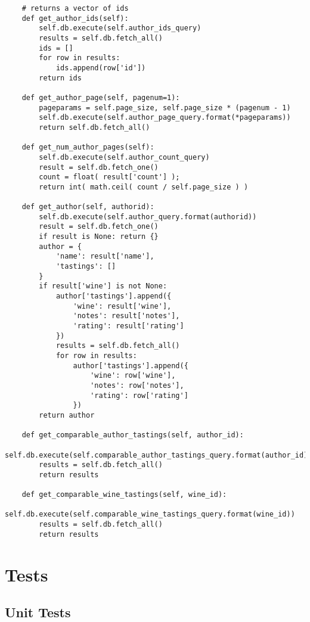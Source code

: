 \begin{verbatim}
    # returns a vector of ids
    def get_author_ids(self):
        self.db.execute(self.author_ids_query)
        results = self.db.fetch_all()
        ids = []
        for row in results:
            ids.append(row['id'])
        return ids

    def get_author_page(self, pagenum=1):
        pageparams = self.page_size, self.page_size * (pagenum - 1)
        self.db.execute(self.author_page_query.format(*pageparams))
        return self.db.fetch_all()

    def get_num_author_pages(self):
        self.db.execute(self.author_count_query)
        result = self.db.fetch_one()
        count = float( result['count'] );
        return int( math.ceil( count / self.page_size ) )

    def get_author(self, authorid):
        self.db.execute(self.author_query.format(authorid))
        result = self.db.fetch_one()
        if result is None: return {}
        author = {
            'name': result['name'],
            'tastings': []
        }
        if result['wine'] is not None:
            author['tastings'].append({
                'wine': result['wine'],
                'notes': result['notes'],
                'rating': result['rating']
            })
            results = self.db.fetch_all()
            for row in results:
                author['tastings'].append({
                    'wine': row['wine'],
                    'notes': row['notes'],
                    'rating': row['rating']
                })
        return author

    def get_comparable_author_tastings(self, author_id):
        self.db.execute(self.comparable_author_tastings_query.format(author_id))
        results = self.db.fetch_all()
        return results

    def get_comparable_wine_tastings(self, wine_id):
        self.db.execute(self.comparable_wine_tastings_query.format(wine_id))
        results = self.db.fetch_all()
        return results
\end{verbatim}

\section{Tests}

\subsection{Unit Tests} \label{app:unittests}


